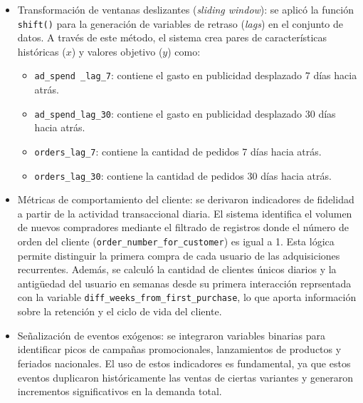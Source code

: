 \begin{itemize}
\begin{itemize}
		esta variable permite cuantificar las variaciones porcentuales en el gasto publicitario diario capturado desde Triple Whale.

	\end{itemize}

\item Transformación de ventanas deslizantes (\textit{sliding window}): se aplicó la función \texttt{shift()} para la generación de variables de retraso (\textit{lags}) en el conjunto de datos. A través de este método, el sistema crea pares de características históricas ($x$) y valores objetivo ($y$) como:
 
	\begin{itemize}
	    \item \texttt{ad\_spend \_lag\_7}: contiene el gasto en publicidad desplazado 7 días hacia atrás.
	    \item \texttt{ad\_spend\_lag\_30}: contiene el gasto en publicidad desplazado 30 días hacia atrás.
	    \item \texttt{orders\_lag\_7}: contiene la cantidad de pedidos 7 días hacia atrás.
	    \item \texttt{orders\_lag\_30}: contiene la cantidad de pedidos 30 días hacia atrás.
	    
	\end{itemize}




	\item Métricas de comportamiento del cliente: se derivaron indicadores de fidelidad a partir de la actividad transaccional diaria. El sistema identifica el volumen de nuevos compradores mediante el filtrado de registros donde el número de orden del cliente (\texttt{order\_number\_for\_customer}) es igual a 1. Esta lógica permite distinguir la primera compra de cada usuario de las adquisiciones recurrentes. Además, se calculó la cantidad de clientes únicos diarios y la antigüedad del usuario en semanas desde su primera interacción reprsentada con la variable \texttt{diff\_weeks\_from\_first\_purchase}, lo que aporta información sobre la retención y el ciclo de vida del cliente.



	\item Señalización de eventos exógenos: se integraron variables binarias para identificar picos de campañas promocionales, lanzamientos de productos y feriados nacionales. El uso de estos indicadores es fundamental, ya que estos eventos duplicaron históricamente las ventas de ciertas variantes y generaron incrementos significativos en la demanda total.

\end{itemize}


